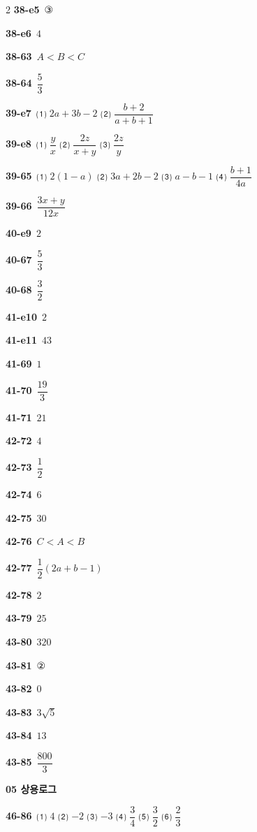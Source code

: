 \documentclass[10pt,a4paper]{article}
\begin{document}
\begin{multicols}{2}
\noindent\textbf{38-e5}\ ③\par
\noindent\textbf{38-e6}\ $4$\par
\noindent\textbf{38-63}\ $A<B<C$\par
\noindent\textbf{38-64}\ $\dfrac{5}{3}$\par
\noindent\textbf{39-e7}\ ⑴ $2a+3b-2$ ⑵ $\dfrac{b+2}{a+b+1}$\par
\noindent\textbf{39-e8}\ ⑴ $\dfrac{y}{x}$ ⑵ $\dfrac{2z}{x+y}$ ⑶ $\dfrac{2z}{y}$\par
\noindent\textbf{39-65}\ ⑴ $2(1-a)$ ⑵ $3a+2b-2$ ⑶ $a-b-1$ ⑷ $\dfrac{b+1}{4a}$\par
\noindent\textbf{39-66}\ $\dfrac{3x+y}{12x}$\par
\noindent\textbf{40-e9}\ $2$\par
\noindent\textbf{40-67}\ $\dfrac{5}{3}$\par
\noindent\textbf{40-68}\ $\dfrac{3}{2}$\par
\noindent\textbf{41-e10}\ $2$\par
\noindent\textbf{41-e11}\ $43$\par
\noindent\textbf{41-69}\ $1$\par
\noindent\textbf{41-70}\ $\dfrac{19}{3}$\par
\noindent\textbf{41-71}\ $21$\par
\noindent\textbf{42-72}\ $4$\par
\noindent\textbf{42-73}\ $\dfrac{1}{2}$\par
\noindent\textbf{42-74}\ $6$\par
\noindent\textbf{42-75}\ $30$\par
\noindent\textbf{42-76}\ $C<A<B$\par
\noindent\textbf{42-77}\ $\dfrac{1}{2}(2a+b-1)$\par
\noindent\textbf{42-78}\ $2$\par
\noindent\textbf{43-79}\ $25$\par
\noindent\textbf{43-80}\ $320$\par
\noindent\textbf{43-81}\ ②\par
\noindent\textbf{43-82}\ $0$\par
\noindent\textbf{43-83}\ $3\sqrt{5}$\par
\noindent\textbf{43-84}\ $13$\par
\noindent\textbf{43-85}\ $\dfrac{800}{3}$\par
\noindent\textbf{05 상용로그}\par\smallskip
\noindent\textbf{46-86}\ ⑴ $4$ ⑵ $-2$ ⑶ $-3$ ⑷ $\dfrac{3}{4}$ ⑸ $\dfrac{3}{2}$ ⑹ $\dfrac{2}{3}$\par

\end{multicols}
\end{document}
